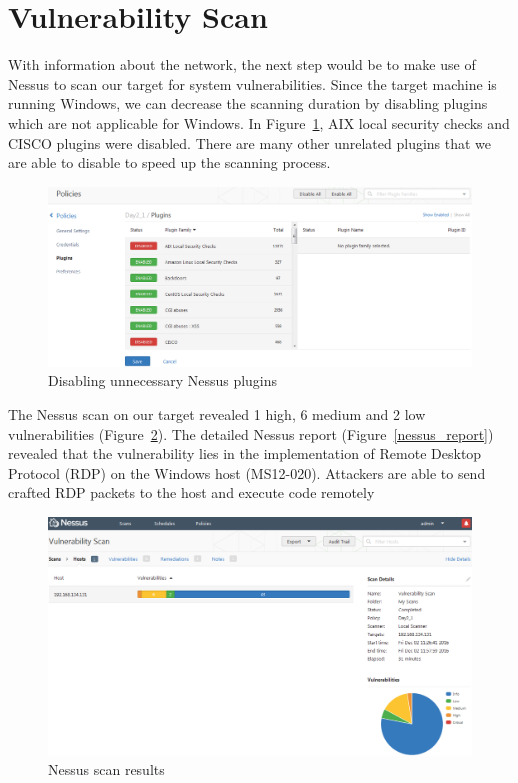 \documentclass{article}[12 pt,a4paper]
\begin{document}
\section{Vulnerability Scan}

With information about the network, the next step would be to make use of Nessus to scan our target for system vulnerabilities. Since the target machine is running Windows, we can decrease the scanning duration by disabling plugins which are not applicable for Windows. In Figure~\ref{nessus_plugin}, AIX local security checks and CISCO plugins were disabled. There are many other unrelated plugins that we are able to disable to speed up the scanning process.

\begin{figure}
\centering
\includegraphics[width=1\textwidth]{scan/nessus_1}
\caption{Disabling unnecessary Nessus plugins}
\label{nessus_plugin}
\end{figure}

The Nessus scan on our target revealed 1 high, 6 medium and 2 low vulnerabilities (Figure~\ref{nessus_scan}). The detailed Nessus report (Figure~\ref{nessus_report}) revealed that the vulnerability lies in the implementation of Remote Desktop Protocol (RDP) on the Windows host (MS12-020). Attackers are able to send crafted RDP packets to the host and execute code remotely
\begin{figure}
\centering
\includegraphics[width=1\textwidth]{scan/nessus_3}
\caption{Nessus scan results}
\label{nessus_scan}
\end{figure}
\end{document}
